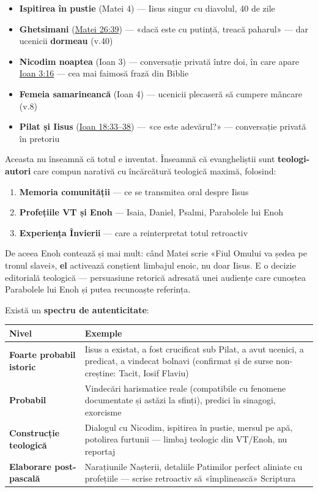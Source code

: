 \documentclass[12pt,a4paper,twoside,openany]{book}
\begin{document}
\begin{itemize}
  \item \textbf{Ispitirea în pustie} (Matei 4) — Iisus singur cu diavolul, 40 de zile
  \item \textbf{Ghetsimani} (\href{https://bibliaortodoxa.ro/carte.php?id=55\&cap=26\#39}{Matei 26:39}) — «dacă este cu putință, treacă paharul» — dar ucenicii \textbf{dormeau} (v.40)
  \item \textbf{Nicodim noaptea} (Ioan 3) — conversație privată între doi, în care apare \href{https://bibliaortodoxa.ro/carte.php?id=35\&cap=3\#16}{Ioan 3:16} — cea mai faimosă frază din Biblie
  \item \textbf{Femeia samarineancă} (Ioan 4) — ucenicii plecaseră să cumpere mâncare (v.8)
  \item \textbf{Pilat și Iisus} (\href{https://bibliaortodoxa.ro/carte.php?id=35\&cap=18\#33}{Ioan 18:33–38}) — «ce este adevărul?» — conversație privată în pretoriu
\end{itemize}
Aceasta nu înseamnă că totul e inventat. Înseamnă că evangheliștii sunt \textbf{teologi-autori} care compun narativă cu încărcătură teologică maximă, folosind:

\begin{enumerate}
  \item \textbf{Memoria comunității} — ce se transmitea oral despre Iisus
  \item \textbf{Profețiile VT și Enoh} — Isaia, Daniel, Psalmi, Parabolele lui Enoh
  \item \textbf{Experiența Învierii} — care a reinterpretat totul retroactiv
\end{enumerate}
De aceea Enoh contează și mai mult: când Matei scrie «Fiul Omului va ședea pe tronul slavei», \textbf{el} activează conștient limbajul enoic, nu doar Iisus. E o decizie editorială teologică — persuasiune retorică adresată unei audiențe care cunoștea Parabolele lui Enoh și putea recunoaște referința.

Există un \textbf{spectru de autenticitate}:

\begin{center}
\small
\begin{tabular}{L{2.0cm}L{13.1cm}}
\toprule
{}
\textbf{Nivel} & \textbf{Exemple} \\
\midrule
\textbf{Foarte probabil istoric} & Iisus a existat, a fost crucificat sub Pilat, a avut ucenici, a predicat, a vindecat bolnavi (confirmat și de surse non-creștine: Tacit, Iosif Flaviu) \\
\textbf{Probabil} & Vindecări harismatice reale (compatibile cu fenomene documentate și astăzi la sfinți), predici în sinagogi, exorcisme \\
\textbf{Construcție teologică} & Dialogul cu Nicodim, ispitirea în pustie, mersul pe apă, potolirea furtunii — limbaj teologic din VT/Enoh, nu reportaj \\
\textbf{Elaborare post-pascală} & Narațiunile Nașterii, detaliile Patimilor perfect aliniate cu profețiile — scrise retroactiv să «împlinească» Scriptura \\
\bottomrule
\end{tabular}
\end{center}
\normalsize
\end{document}
